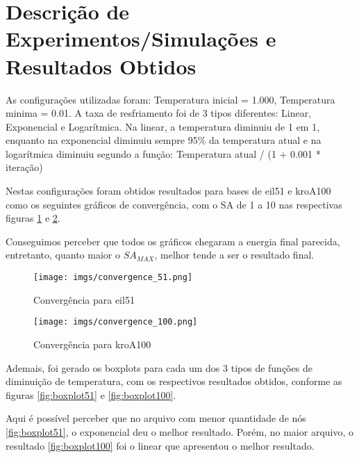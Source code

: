 \documentclass[12pt]{article}
\begin{document}

\section{Descrição de Experimentos/Simulações e Resultados Obtidos}
\label{sec:descicao_de_experimentos_/_simulacoes_e_resultados_obtidos}

As configurações utilizadas foram: Temperatura inicial = 1.000, Temperatura minima = 0.01. A taxa de resfriamento foi de 3 tipos diferentes: Linear, Exponencial e Logarítmica. 
%
Na linear, a temperatura diminuiu de 1 em 1, enquanto na exponencial diminuiu sempre 95\% da temperatura atual e na logarítmica diminuiu segundo a função: Temperatura atual / (1 + 0.001 * iteração)


Nestas configurações foram obtidos resultados para bases de eil51 e kroA100 como os seguintes gráficos de convergência, com o SA de 1 a 10 nas respectivas figuras \ref{fig:convergencia51} e \ref{fig:convergencia100}.

Conseguimos perceber que todos os gráficos chegaram a energia final parecida, entretanto, quanto maior o $SA_{MAX}$, melhor tende a ser o resultado final.

\begin{figure}[H]
  \centering
  \texttt{[image: imgs/convergence\_51.png]}
  \caption{Convergência para eil51}
  \label{fig:convergencia51}
  \end{figure}

\begin{figure}[H]
  \centering
  \texttt{[image: imgs/convergence\_100.png]}
  \caption{Convergência para kroA100}
  \label{fig:convergencia100}
   \end{figure}

Ademais, foi gerado os boxplots para cada um dos 3 tipos de funções de diminuição de temperatura, com os respectivos resultados obtidos, conforme as figuras \ref{fig:boxplot51} e \ref{fig:boxplot100}.

Aqui é possível perceber que no arquivo com menor quantidade de nós \ref{fig:boxplot51}, o exponencial deu o melhor resultado. 
Porém, no maior arquivo, o resultado \ref{fig:boxplot100} foi o linear que apresentou o melhor resultado.
\end{document}
